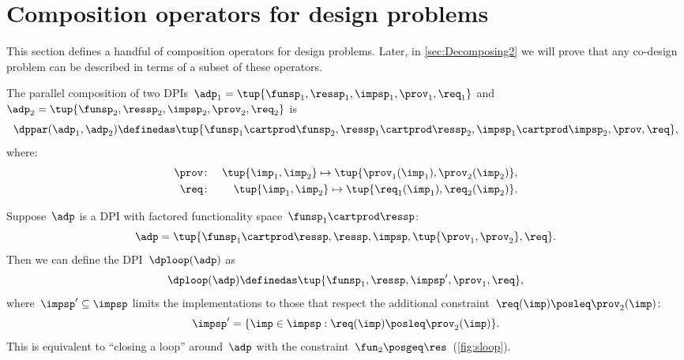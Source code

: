 

\section{Composition operators for design problems}

This section defines a handful of composition operators for design
problems.
Later, in \cref{sec:Decomposing2} we will prove that any co-design
problem can be described in terms of a subset of these operators.

\label{sec:threeoperators}

\begin{definition}[$\dppar$]
    \label{def:parallel}
    The parallel composition of two DPIs~$\adp_{1}=\tup{\funsp_{1},\ressp_{1},\impsp_{1},\prov_{1},\req_{1}}$
    and~$\adp_{2}=\tup{\funsp_{2},\ressp_{2},\impsp_{2},\prov_{2},
        \req_{2}}$ is
    \begin{equation*}
        \dppar(\adp_{1},\adp_{2})\definedas\tup{\funsp_{1}\cartprod\funsp_{2},\ressp_{1}\cartprod\ressp_{2},\impsp_{1}\cartprod\impsp_{2},\prov,\req} ,
    \end{equation*}
    where:
    \begin{eqnarray}
        \prov & \colon & \tup{ \imp_{1},\imp_{2}} \mapsto \tup{\prov_{1}(\imp_{1}),\prov_{2}(\imp_{2})} ,\label{eq:dppar-exec}\\
        \req & \colon & \tup{ \imp_{1},\imp_{2}}\mapsto\tup{\req_{1}(\imp_{1}),\req_{2}(\imp_{2})} .\nonumber
    \end{eqnarray}

\end{definition}


\begin{definition}[$\dploop$]
    \label{def:dp_loop}Suppose~$\adp$ is a DPI with factored functionality
    space~$\funsp_{1}\cartprod\ressp$:
    \begin{equation*}
        \adp=\tup{ \funsp_{1}\cartprod\ressp,\ressp,\impsp,\tup{ \prov_{1},\prov_{2}} ,\req}.
    \end{equation*}
    Then we can define the DPI~$\dploop(\adp)$ as
    \begin{equation*}
        \dploop(\adp)\definedas\tup{ \funsp_{1},\ressp,\impsp',\prov_{1},\req} ,
    \end{equation*}
    where~$\impsp'\subseteq\impsp$ limits the implementations to those
    that respect the additional constraint~$\req(\imp)\posleq\prov_{2}(\imp)$:
    \begin{equation*}
        \impsp'=\{\imp\in\impsp:\req(\imp)\posleq\prov_{2}(\imp)\}.
    \end{equation*}
    This is equivalent to ``closing a loop'' around~$\adp$ with
    the constraint~$\fun_{2}\posgeq\res$~(\cref{fig:sloop}).
\end{definition}

